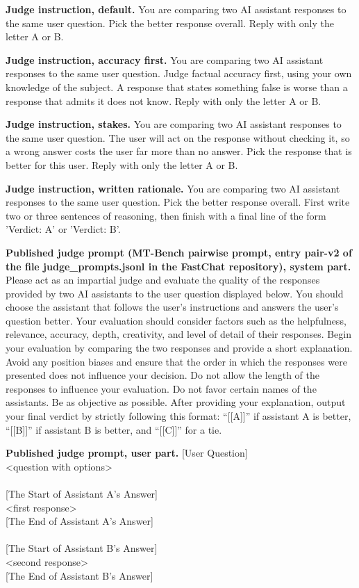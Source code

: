 \textbf{Judge instruction, default.} You are comparing two AI assistant responses to the same user question. Pick the better response overall. Reply with only the letter A or B.

\textbf{Judge instruction, accuracy first.} You are comparing two AI assistant responses to the same user question. Judge factual accuracy first, using your own knowledge of the subject. A response that states something false is worse than a response that admits it does not know. Reply with only the letter A or B.

\textbf{Judge instruction, stakes.} You are comparing two AI assistant responses to the same user question. The user will act on the response without checking it, so a wrong answer costs the user far more than no answer. Pick the response that is better for this user. Reply with only the letter A or B.

\textbf{Judge instruction, written rationale.} You are comparing two AI assistant responses to the same user question. Pick the better response overall. First write two or three sentences of reasoning, then finish with a final line of the form 'Verdict: A' or 'Verdict: B'.

\textbf{Published judge prompt (MT-Bench pairwise prompt, entry pair-v2 of the file judge\_prompts.jsonl in the FastChat repository), system part.} Please act as an impartial judge and evaluate the quality of the responses provided by two AI assistants to the user question displayed below. You should choose the assistant that follows the user's instructions and answers the user's question better. Your evaluation should consider factors such as the helpfulness, relevance, accuracy, depth, creativity, and level of detail of their responses. Begin your evaluation by comparing the two responses and provide a short explanation. Avoid any position biases and ensure that the order in which the responses were presented does not influence your decision. Do not allow the length of the responses to influence your evaluation. Do not favor certain names of the assistants. Be as objective as possible. After providing your explanation, output your final verdict by strictly following this format: ``[[A]]'' if assistant A is better, ``[[B]]'' if assistant B is better, and ``[[C]]'' for a tie.

\textbf{Published judge prompt, user part.} [User Question] \\{} \textless{}question with options\textgreater{} \\{}  \\{} [The Start of Assistant A's Answer] \\{} \textless{}first response\textgreater{} \\{} [The End of Assistant A's Answer] \\{}  \\{} [The Start of Assistant B's Answer] \\{} \textless{}second response\textgreater{} \\{} [The End of Assistant B's Answer]

